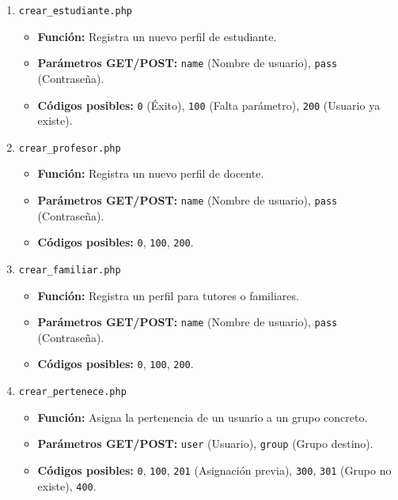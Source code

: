 \begin{enumerate}
    \item \texttt{crear\_estudiante.php}
    \begin{itemize}
        \item \textbf{Función:} Registra un nuevo perfil de estudiante.
        \item \textbf{Parámetros GET/POST:} \texttt{name} (Nombre de usuario), \texttt{pass} (Contraseña).
        \item \textbf{Códigos posibles:} \texttt{0} (Éxito), \texttt{100} (Falta parámetro), \texttt{200} (Usuario ya existe).
    \end{itemize}

    \item \texttt{crear\_profesor.php}
    \begin{itemize}
        \item \textbf{Función:} Registra un nuevo perfil de docente.
        \item \textbf{Parámetros GET/POST:} \texttt{name} (Nombre de usuario), \texttt{pass} (Contraseña).
        \item \textbf{Códigos posibles:} \texttt{0}, \texttt{100}, \texttt{200}.
    \end{itemize}

    \item \texttt{crear\_familiar.php}
    \begin{itemize}
        \item \textbf{Función:} Registra un perfil para tutores o familiares.
        \item \textbf{Parámetros GET/POST:} \texttt{name} (Nombre de usuario), \texttt{pass} (Contraseña).
        \item \textbf{Códigos posibles:} \texttt{0}, \texttt{100}, \texttt{200}.
    \end{itemize}

    \item \texttt{crear\_pertenece.php}
    \begin{itemize}
        \item \textbf{Función:} Asigna la pertenencia de un usuario a un grupo concreto.
        \item \textbf{Parámetros GET/POST:} \texttt{user} (Usuario), \texttt{group} (Grupo destino).
        \item \textbf{Códigos posibles:} \texttt{0}, \texttt{100}, \texttt{201} (Asignación previa), \texttt{300}, \texttt{301} (Grupo no existe), \texttt{400}.
    \end{itemize}


\end{enumerate}
